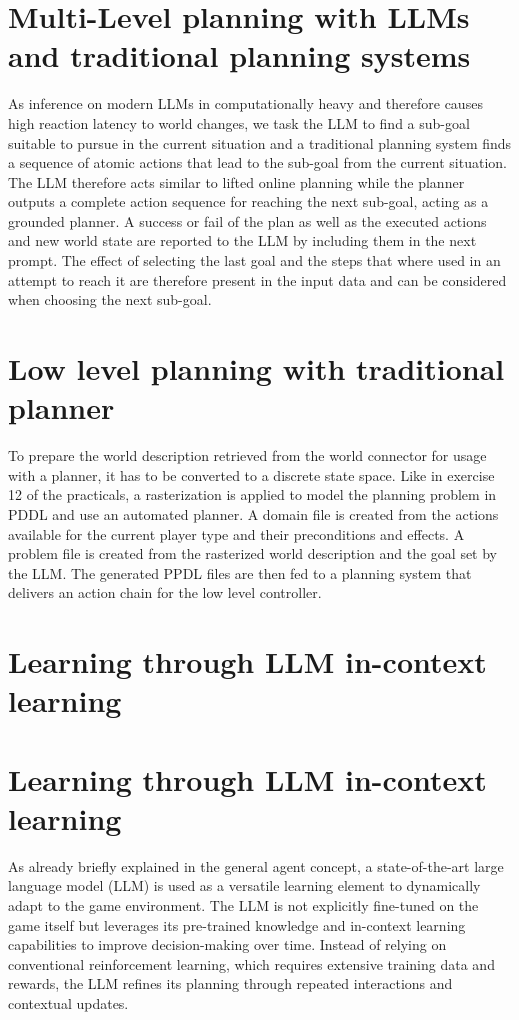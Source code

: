 \documentclass{article}
\begin{document}
\section{Multi-Level planning with LLMs and traditional planning systems}

As inference on modern LLMs in computationally heavy and therefore causes high reaction latency to world changes, we task the LLM to find a sub-goal suitable to pursue in the current situation and a traditional planning system finds a sequence of atomic actions that lead to the sub-goal from the current situation. The LLM therefore acts similar to lifted online planning while the planner outputs a complete action sequence for reaching the next sub-goal, acting as a grounded planner. A success or fail of the plan as well as the executed actions and new world state are reported to the LLM by including them in the next prompt. The effect of selecting the last goal and the steps that where used in an attempt to reach it are therefore present in the input data and can be considered when choosing the next sub-goal.

\section{Low level planning with traditional planner}

To prepare the world description retrieved from the world connector for usage with a planner, it has to be converted to a discrete state space. Like in exercise 12 of the practicals, a rasterization is applied to model the planning problem in PDDL and use an automated planner. A domain file is created from the actions available for the current player type and their preconditions and effects. A problem file is created from the rasterized world description and the goal set by the LLM. The generated PPDL files are then fed to a planning system that delivers an action chain for the low level controller.

\section{Learning through LLM in-context learning}
\section{Learning through LLM in-context learning}
As already briefly explained in the general agent concept, a state-of-the-art large language model (LLM) is used as a versatile learning element 
to dynamically adapt to the game environment. 
The LLM is not explicitly fine-tuned on the game itself but leverages its pre-trained knowledge and in-context learning capabilities 
to improve decision-making over time. Instead of relying on conventional reinforcement learning, 
which requires extensive training data and rewards, the LLM refines its planning through repeated interactions and contextual updates.
\end{document}
